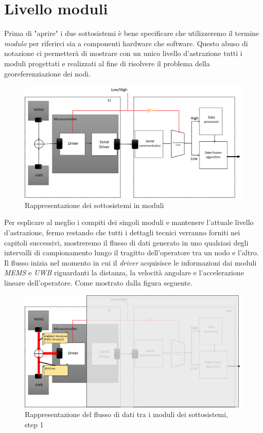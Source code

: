 \section{Livello moduli}

Prima di "aprire" i due sottosistemi è bene specificare che utilizzeremo il termine \textit{modulo} per riferirci sia a componenti hardware che software. Questo abuso di notazione ci permetterà di mostrare con un unico livello d'astrazione tutti i moduli progettati e realizzati al fine di risolvere il problema della georeferenziazione dei nodi.
\begin{figure}[H]  
\includegraphics[scale=0.3 ]{DescrizioneDelSistema/sistema_liv2.png}
\caption{Rappresentazione dei sottosistemi in moduli}
\label{fig:sistema_liv2}
\end{figure}
Per esplicare al meglio i compiti dei singoli moduli e mantenere l'attuale livello d'astrazione, fermo restando che tutti i dettagli tecnici verranno forniti nei capitoli successivi, mostreremo il flusso di dati generato in uno qualsiasi degli intervalli di campionamento lungo il tragitto dell'operatore tra un nodo e l'altro.\\ 
Il flusso inizia nel momento in cui il \textit{driver} acquisisce le informazioni dai moduli \textit{MEMS} e \textit{UWB} riguardanti la distanza, la velocità angolare e l'accelerazione lineare dell'operatore. Come mostrato dalla figura seguente. 
\begin{figure}[H] 
	\centering 
	\includegraphics[scale=0.25 ]{DescrizioneDelSistema/flusso1.png}
	\caption{Rappresentazione del flusso di dati tra i moduli dei sottosistemi, step 1}
	\label{fig:flusso1}
\end{figure}
